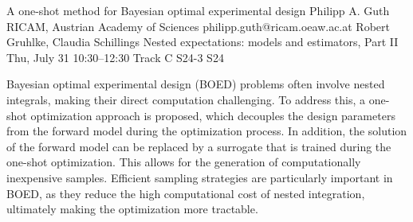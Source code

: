 \begin{talk}
  {A one-shot method for Bayesian optimal experimental design}%
  {Philipp A. Guth}%
  {RICAM, Austrian Academy of Sciences}%
  {philipp.guth@ricam.oeaw.ac.at}%
  {Robert Gruhlke, Claudia Schillings}%
  {Nested expectations: models and estimators, Part II}%
  {Thu, July 31 10:30–12:30 Track C}%
  {S24-3}%
  {S24}%
				
		
Bayesian optimal experimental design (BOED) problems often involve nested integrals, making their direct computation challenging. To address this, a one-shot optimization approach is proposed, which decouples the design parameters from the forward model during the optimization process. In addition, the solution of the forward model can be replaced by a surrogate that is trained during the one-shot optimization. This allows for the generation of computationally inexpensive samples. Efficient sampling strategies are particularly important in BOED, as they reduce the high computational cost of nested integration, ultimately making the optimization more tractable.



%
%
\end{talk}

